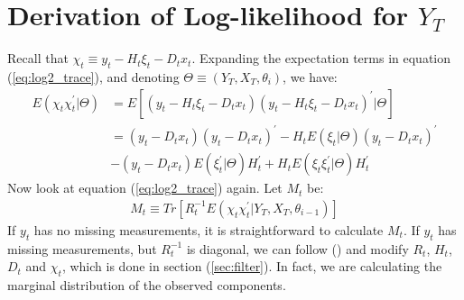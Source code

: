 \documentclass[12pt]{article}
\numberwithin{equation}{section}
\begin{document}
\section{Derivation of Log-likelihood for $Y_T$} \label{ap:log2}
Recall that $\chi_t \equiv y_t - H_t\xi_t - D_tx_t$. Expanding the expectation terms in equation (\ref{eq:log2_trace}), and denoting $\Theta \equiv (Y_T,X_T,\theta_i)$, we have:
\begin{align*}
    E(\chi_t\chi_t^{'}|\Theta) &= E[(y_t - H_t\xi_t - D_tx_t)(y_t - H_t\xi_t - D_tx_t)^{'}|\Theta] \\
    &= (y_t-D_tx_t)(y_t-D_tx_t)^{'} - H_tE(\xi_t|\Theta)(y_t-D_tx_t)^{'} \\
    &-(y_t-D_tx_t)E(\xi_t^{'}|\Theta)H_t^{'} + H_tE(\xi_t\xi_t^{'}|\Theta)H_t^{'}
\end{align*}
Now look at equation (\ref{eq:log2_trace}) again. Let $M_t$ be:
\begin{align}
    M_t \equiv Tr[R_t^{-1}E(\chi_t\chi_t^{'}|Y_T,X_T,\theta_{i-1})] \label{eq:trace}
\end{align}
If $y_t$ has no missing measurements, it is straightforward to calculate $M_t$. If $y_t$ has missing measurements, but $R_t^{-1}$ is diagonal, we can follow (\cite{shumway_stoffer_1982}) and modify $R_t$, $H_t$, $D_t$ and $\chi_t$, which is done in section (\ref{sec:filter}). In fact, we are calculating the marginal distribution of the observed components. 
\end{document}
